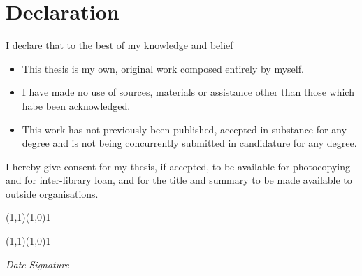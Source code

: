 \begingroup
\renewcommand{\cleardoublepage}{}
\renewcommand{\clearpage}{}
\newpage
{ 


\chapter*{Declaration}
\label{sec:declaration}

I declare that to the best of my knowledge and belief

\begin{itemize}
	\item This thesis is my own, original work composed entirely by myself.

	\item  I have made no use of sources, materials or assistance other than those which habe been acknowledged.

	\item This work has not previously been published, accepted in substance for any degree and is not being concurrently submitted in candidature for any degree.

\end{itemize}


I hereby give consent for my thesis, if accepted, to be available for photocopying and for inter-library loan, and for the title and summary to be made available to outside organisations.




\vfill

\setlength{\unitlength}{120pt}

\newcommand{\alinie}{\begin{picture}(1,1)\linethickness{0.08pt}\line(1,0){1}\end{picture}}

\alinie\hfill\alinie

\textit{Date} \hfill \textit{Signature}



}
\endgroup